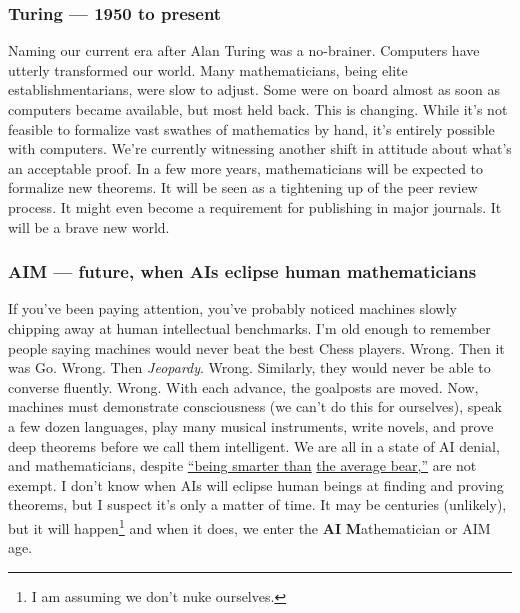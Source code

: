 \subsubsection*{Turing --- 1950 to present}%

Naming our current era after Alan Turing was a no-brainer. Computers
have utterly transformed our world. Many mathematicians, being elite
establishmentarians, were slow to adjust. Some were on board almost as
soon as computers became available, but most held back. This is
changing. While it's not feasible to formalize vast swathes of
mathematics by hand, it's entirely possible with computers. We're
currently witnessing another shift in attitude about what's an
acceptable proof. In a few more years, mathematicians will be expected
to formalize new theorems. It will be seen as a tightening up of the
peer review process. It might even become a requirement for publishing
in major journals. It will be a brave new world.

\subsubsection*{AIM --- future, when AIs eclipse human mathematicians}%

If you've been paying attention, you've probably noticed machines
slowly chipping away at human intellectual benchmarks. I'm old enough
to
remember people saying machines would never beat the best Chess
players.
Wrong. Then it was Go. Wrong. Then \emph{Jeopardy}. Wrong. Similarly,
they would never be able to converse fluently. Wrong. With each
advance,
the goalposts are moved. Now, machines must demonstrate consciousness
(we can't do this for ourselves), speak a few dozen languages, play many
musical instruments, write novels, and prove deep theorems before we
call them intelligent. We are all in a state of AI denial, and
mathematicians, despite
\href{https://www.youtube.com/watch?v=CCCx1j8WsHU}{``being smarter than}
\href{https://www.youtube.com/watch?v=CCCx1j8WsHU}{the average bear,''}
are not exempt. I don't know when AIs will eclipse human beings at
finding and proving theorems, but I suspect it's only a matter of time.
It may be centuries (unlikely), but it will
happen\footnote{I am assuming we don't nuke ourselves.}
and when it does, we enter the \textbf{AI} \textbf{M}athematician or AIM
age.

%


%
 
